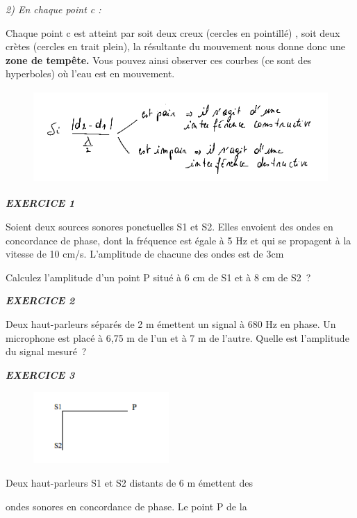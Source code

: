 \emph{2) En chaque point c : }

Chaque point c est atteint par soit deux creux (cercles en pointillé) ,
soit deux crètes (cercles en trait plein), la résultante du mouvement
nous donne donc une \textbf{zone de tempête.} Vous pouvez ainsi observer
ces courbes (ce sont des hyperboles) où l'eau est en mouvement.

\begin{figure}
\centering
\includegraphics[width=13.005cm,height=3.542cm]{Pictures/1000000100000220000000A31734CD7DA5F285B4.png}
\caption{}
\end{figure}

\emph{\textbf{EXERCICE 1}}

Soient deux sources sonores ponctuelles S1 et S2. Elles envoient des
ondes en concordance de phase, dont la fréquence est égale à 5 Hz et qui
se propagent à la vitesse de 10 cm/s. L'amplitude de chacune des ondes
est de 3cm

Calculez l'amplitude d'un point P situé à 6 cm de S1 et à 8 cm de S2~?

\emph{\textbf{EXERCICE 2}}

Deux haut-parleurs séparés de 2 m émettent un signal à 680 Hz en phase.
Un microphone est placé à 6,75 m de l'un et à 7 m de l'autre. Quelle est
l'amplitude du signal mesuré~?

\emph{\textbf{EXERCICE 3}}

\begin{figure}
\centering
\includegraphics[width=5.151cm,height=2.729cm]{Pictures/10000001000000BC000000630AF71C86AA2A0A65.png}
\caption{}
\end{figure}

Deux haut-parleurs S1 et S2 distants de 6 m émettent des

ondes sonores en concordance de phase. Le point P de la

